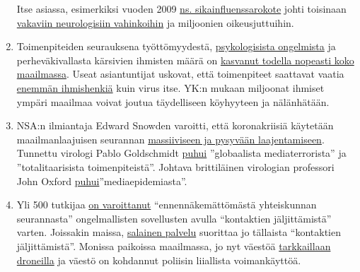 \begin{enumerate}
  Itse asiassa, esimerkiksi vuoden 2009
  \href{https://www.forbes.com/2010/02/05/world-health-organization-swine-flu-pandemic-opinions-contributors-michael-fumento.html\#2bfd64ff48e8}{ns.
  sikainfluenssarokote} johti toisinaan
  \href{https://www.ibtimes.co.uk/brain-damaged-uk-victims-swine-flu-vaccine-get-60-million-compensation-1438572}{vakaviin
  neurologisiin vahinkoihin} ja miljoonien oikeusjuttuihin.
\item
  Toimenpiteiden seurauksena työttömyydestä,
  \href{https://eu.indystar.com/story/news/health/2020/04/03/coronavirus-indiana-how-get-help-mental-health-addiction/5104357002/}{psykologisista
  ongelmista} ja perheväkivallasta kärsivien ihmisten määrä on
  \href{https://www.reuters.com/article/us-health-coronavirus-usa-layoffs/us-weekly-jobless-claims-seen-at-record-high-again-idUSKBN21K0FX}{kasvanut
  todella nopeasti koko maailmassa}. Useat asiantuntijat uskovat, että
  toimenpiteet saattavat vaatia
  \href{https://www.nytimes.com/2020/03/20/opinion/coronavirus-pandemic-social-distancing.html}{enemmän
  ihmishenkiä} kuin virus itse. YK:n mukaan miljoonat ihmiset ympäri
  maailmaa voivat joutua täydelliseen köyhyyteen ja nälänhätään.
\item
  NSA:n ilmiantaja Edward Snowden varoitti, että koronakriisiä käytetään
  maailmanlaajuisen seurannan
  \href{https://www.youtube.com/watch?v=-pcQFTzck_c}{massiiviseen ja
  pysyvään laajentamiseen}. Tunnettu virologi Pablo Goldschmidt
  \href{https://www.rubikon.news/artikel/der-corona-totalitarismus}{puhui}
  ''globaalista mediaterrorista'' ja ''totalitaarisista
  toimenpiteistä''. Johtava brittiläinen virologian professori John
  Oxford
  \href{https://novuscomms.com/2020/03/31/a-view-from-the-hvivo-open-orphan-orph-laboratory-professor-john-oxford/}{puhui}''mediaepidemiasta''.
\item
  Yli 500 tutkijaa
  \href{https://www.esat.kuleuven.be/cosic/sites/contact-tracing-joint-statement/}{on
  varoittanut} ``ennennäkemättömästä yhteiskunnan seurannasta''
  ongelmallisten sovellusten avulla ``kontaktien jäljittämistä'' varten.
  Joissakin maissa,
  \href{https://www.jewishpress.com/news/the-courts/state-to-high-court-even-more-shin-bet-involvement-in-fighting-the-coronavirus/2020/04/14/}{salainen
  palvelu} suorittaa jo tällaista ``kontaktien jäljittämistä''. Monissa
  paikoissa maailmassa, jo nyt väestöä
  \href{https://off-guardian.org/2020/04/25/50-headlines-darker-more-of-the-new-normal/}{tarkkaillaan
  droneilla} ja väestö on kohdannut poliisin liiallista voimankäyttöä.
\end{enumerate}

